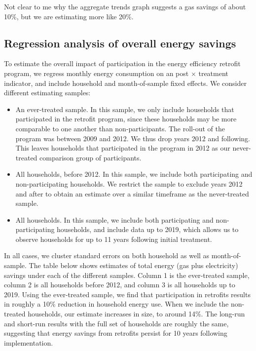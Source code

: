 \documentclass{article}
\begin{document}
{\color{red} Not clear to me why the aggregate trends graph suggests a gas savings of about 10\%, but we are estimating more like 20\%.}

\subsection{Regression analysis of overall energy savings}
To estimate the overall impact of participation in the energy efficiency retrofit program, we regress monthly energy consumption on an post $\times$ treatment indicator, and include household and month-of-sample fixed effects.  We consider different estimating samples:
\begin{itemize}
	\item An ever-treated sample. In this sample, we only include households that participated in the retrofit program, since these households may be more comparable to one another than non-participants. The roll-out of the program was between 2009 and 2012. We thus drop years 2012 and following. This leaves households that participated in the program in 2012 as our never-treated comparison group of participants.
	\item All households, before 2012. In this sample, we include both participating and non-participating households. We restrict the sample to exclude years 2012 and after to obtain an estimate over a similar timeframe as the never-treated sample.
	\item All households. In this sample, we include both participating and non-participating households, and include data up to 2019, which allows us to observe households for up to 11 years following initial treatment.
\end{itemize}
In all cases, we cluster standard errors on both household as well as month-of-sample.  The table below shows estimates of total energy (gas plus electricity) savings under each of the different samples.  Column 1 is the ever-treated sample, column 2 is all households before 2012, and column 3 is all households up to 2019.  Using the ever-treated sample, we find that participation in retrofits results in roughly a 10\% reduction in household energy use. When we include the non-treated households, our estimate increases in size, to around 14\%.  The long-run and short-run results with the full set of households are roughly the same, suggesting that energy savings from retrofits persist for 10 years following implementation.


\end{document}
